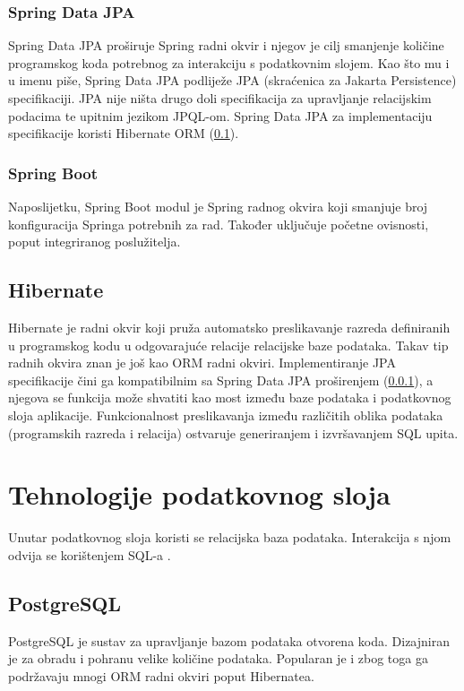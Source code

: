 \documentclass[times, utf8, zavrsni, numeric]{fer}
\begin{document}
			\subsubsection{Spring Data JPA}
			\label{subsubsec:spingdatajpa}
			Spring Data JPA proširuje Spring radni okvir i njegov je cilj smanjenje količine programskog koda potrebnog za interakciju s podatkovnim slojem. Kao što mu i u imenu piše, Spring Data JPA podliježe JPA (skraćenica za Jakarta Persistence) specifikaciji. JPA nije ništa drugo doli specifikacija za upravljanje relacijskim podacima te upitnim jezikom  JPQL-om. Spring Data JPA za implementaciju specifikacije koristi Hibernate ORM (\ref{subsec:hibernate}).
			\subsubsection{Spring Boot}
			Naposlijetku, Spring Boot modul je Spring radnog okvira koji smanjuje broj konfiguracija Springa potrebnih za rad. Također uključuje početne ovisnosti, poput integriranog poslužitelja.
			\subsection{Hibernate}
			\label{subsec:hibernate}
			Hibernate\cite{hibernate2021} je radni okvir koji pruža automatsko preslikavanje razreda definiranih u programskog kodu u odgovarajuće relacije relacijske baze podataka. Takav tip radnih okvira znan je još kao ORM  radni okviri. Implementiranje JPA specifikacije čini ga kompatibilnim sa Spring Data JPA proširenjem (\ref{subsubsec:spingdatajpa}), a njegova se funkcija može shvatiti kao most između baze podataka  i podatkovnog sloja aplikacije. Funkcionalnost preslikavanja između različitih oblika podataka (programskih razreda i relacija) ostvaruje generiranjem i izvršavanjem SQL upita.
	
	
		\section{Tehnologije podatkovnog sloja}
		Unutar podatkovnog sloja koristi se relacijska baza podataka. Interakcija s njom odvija se korištenjem SQL-a .
			\subsection{PostgreSQL}
			PostgreSQL\cite{postgresql2021} je sustav za upravljanje bazom podataka otvorena koda. Dizajniran je za obradu i pohranu velike količine podataka. Popularan je i zbog toga ga podržavaju mnogi ORM radni okviri poput Hibernatea.
\end{document}
